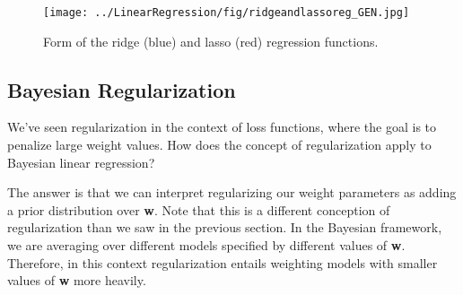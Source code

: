 \begin{figure}
    \centering
    \texttt{[image: ../LinearRegression/fig/ridgeandlassoreg\_GEN.jpg]}
    \caption{Form of the ridge (blue) and lasso (red) regression functions.}
    \label{fig:ridge-and-lasso-reg-fn-form}
\end{figure}


\subsection{Bayesian Regularization} \label{bayesian-regularization-section}
We've seen regularization in the context of loss functions, where the goal is to penalize large weight values. How does the concept of regularization apply to Bayesian linear regression?

The answer is that we can interpret regularizing our weight parameters as adding a prior distribution over \textbf{w}. Note that this is a different conception of regularization than we saw in the previous section. In the Bayesian framework, we are averaging over different models specified by different values of \textbf{w}. Therefore, in this context regularization entails weighting models with smaller values of \textbf{w} more heavily.

